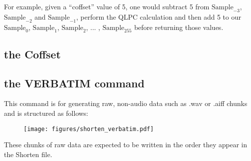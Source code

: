 For example, given a ``coffset'' value of 5, one would subtract 5 from
$\text{Sample}_{-3}$, $\text{Sample}_{-2}$ and $\text{Sample}_{-1}$,
perform the QLPC calculation and then add 5 to our
$\text{Sample}_{0}$, $\text{Sample}_{1}$, $\text{Sample}_{2}$, ... ,
$\text{Sample}_{255}$
before returning those values.



\label{shorten_coffset}
\subsection{the Coffset}



\subsection{the VERBATIM command}

This command is for generating raw, non-audio data such
as .wav or .aiff chunks and is structured as follows:
\begin{figure}[h]
\texttt{[image: figures/shorten\_verbatim.pdf]}
\end{figure}
\par
\noindent
These chunks of raw data are expected to be written in the order
they appear in the Shorten file.

